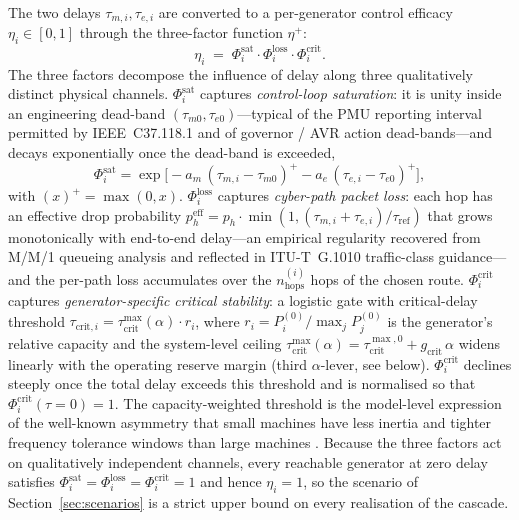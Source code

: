 The two delays $\tau_{m,i},\tau_{e,i}$ are converted to a per-generator
control efficacy $\eta_i\in[0,1]$ through the three-factor function
$\eta^{+}$:
\begin{equation}\label{eq:etaplus}
  \eta_i \;=\; \Phi^{\text{sat}}_i \cdot \Phi^{\text{loss}}_i \cdot
               \Phi^{\text{crit}}_i .
\end{equation}
The three factors decompose the influence of delay along three
qualitatively distinct physical channels.  $\Phi^{\text{sat}}_i$
captures \emph{control-loop saturation}: it is unity inside an
engineering dead-band $(\tau_{m0},\tau_{e0})$---typical of the
PMU reporting interval permitted by IEEE~C37.118.1
\citep{IEEE_C37_118_2} and of governor / AVR action dead-bands---and
decays exponentially once the dead-band is exceeded,
\begin{equation}\label{eq:phi_sat}
  \Phi^{\text{sat}}_i = \exp\!\bigl[
       -a_m\,(\tau_{m,i}-\tau_{m0})^{+}
       -a_e\,(\tau_{e,i}-\tau_{e0})^{+}
     \bigr],
\end{equation}
with $(x)^{+}=\max(0,x)$.  $\Phi^{\text{loss}}_i$ captures
\emph{cyber-path packet loss}: each hop has an effective drop
probability $p_h^{\text{eff}}=p_h\cdot\min(1,(\tau_{m,i}+\tau_{e,i})/\tau_{\text{ref}})$
that grows monotonically with end-to-end delay---an
empirical regularity recovered from M/M/1 queueing analysis
\citep{Kleinrock1975} and reflected in ITU-T~G.1010 traffic-class
guidance---and the per-path loss accumulates over the
$n_{\text{hops}}^{(i)}$ hops of the chosen route.
$\Phi^{\text{crit}}_i$ captures \emph{generator-specific critical
stability}: a logistic gate with critical-delay threshold
$\tau_{\text{crit},i}=\tau_{\text{crit}}^{\max}(\alpha)\cdot r_i$,
where $r_i=P_i^{(0)}/\max_j P_j^{(0)}$ is the generator's
relative capacity and the system-level ceiling
$\tau_{\text{crit}}^{\max}(\alpha)=\tau_{\text{crit}}^{\max,0}+
g_{\text{crit}}\,\alpha$ widens linearly with the operating reserve
margin (third $\alpha$-lever, see below).  $\Phi^{\text{crit}}_i$
declines steeply once the total delay exceeds this threshold and is
normalised so that $\Phi^{\text{crit}}_i(\tau{=}0)=1$.  The capacity-weighted
threshold is the model-level expression of the well-known
asymmetry that small machines have less inertia and tighter
frequency tolerance windows than large machines
\citep{Kundur2017CPPS}.  Because the three factors act on
qualitatively independent channels, every reachable generator at
zero delay satisfies $\Phi^{\text{sat}}_i=\Phi^{\text{loss}}_i=
\Phi^{\text{crit}}_i=1$ and hence $\eta_i=1$, so the
\nodelay{} scenario of Section~\ref{sec:scenarios} is a strict
upper bound on every realisation of the cascade.

